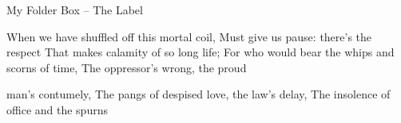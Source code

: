 \documentclass[landscape]{scrartcl}
\begin{document}
\begin{folderbox}{My Folder Box -- The Label}
{{When we have shuffled off this mortal coil,
Must give us pause: there's the respect
That makes calamity of so long life;
For who would bear the whips and scorns of time,
The oppressor's wrong, the proud

man's contumely,
The pangs of despised love, the law's delay,
The insolence of office and the spurns
}
}




\end{folderbox}
\end{document}
